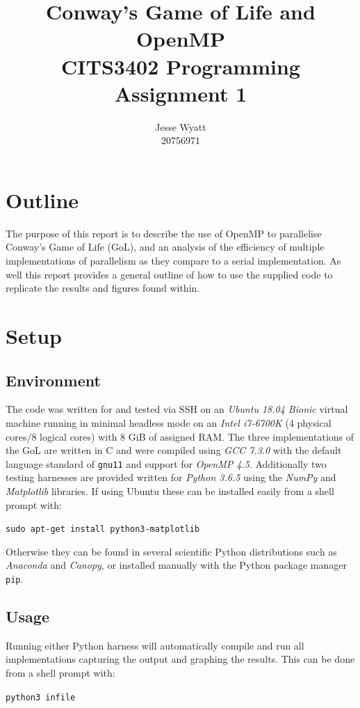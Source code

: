 \documentclass[]{article}
\title{Conway's Game of Life and OpenMP\\
\large CITS3402 Programming Assignment 1}
\author{Jesse Wyatt\\20756971}
\begin{document}
\maketitle

\section{Outline}
The purpose of this report is to describe the use of OpenMP to parallelise Conway's Game of Life (GoL), and an analysis of the efficiency of multiple implementations of parallelism as they compare to a serial implementation. As well this report provides a general outline of how to use the supplied code to replicate the results and figures found within.

\section{Setup}
\subsection{Environment}
The code was written for and tested via SSH on an \textit{Ubuntu 18.04 Bionic} virtual machine running in minimal headless mode on an \textit{Intel i7-6700K} (4 physical cores/8 logical cores) with 8 GiB of assigned RAM. The three implementations of the GoL are written in C and were compiled using \textit{GCC 7.3.0} with the default language standard of \texttt{gnu11} and support for \textit{OpenMP 4.5}. Additionally two testing harnesses are provided written for \textit{Python 3.6.5} using the \textit{NumPy} and \textit{Matplotlib} libraries. If using Ubuntu these can be installed easily from a shell prompt with:
\begin{quoting}
	\texttt{sudo apt-get install python3-matplotlib}
\end{quoting}
Otherwise they can be found in several scientific Python distributions such as \textit{Anaconda} and \textit{Canopy}, or installed manually with the Python package manager \texttt{pip}.

\subsection{Usage}
Running either Python harness will automatically compile and run all implementations capturing the output and graphing the results. This can be done from a shell prompt with:
\begin{quoting}
\texttt{python3 infile}
\end{quoting}
\end{document}
